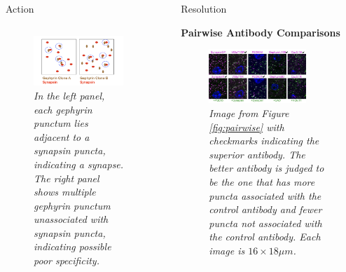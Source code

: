 \documentclass[final, table]{beamer}
\newlength{\sepwid}
\newlength{\onecolwid}
\newlength{\twocolwid}
\begin{document}
\begin{frame}[t]
\begin{columns}[t]
\begin{column}{\twocolwid}
\begin{block}{Action}
\begin{columns}[t]
\begin{column}{\onecolwid}
\begin{figure}
\centering
\includegraphics[width=1\textwidth]{figs/ab_precision_cartoon}
\caption{\textit{In the left panel, each gephyrin punctum lies adjacent to a synapsin puncta, indicating a synapse.  The right panel shows multiple gephyrin punctum unassociated with synapsin puncta, indicating possible poor specificity. } }
\end{figure}


\end{column}
\end{columns} 
\end{block}
\end{column} 

\begin{column}{\sepwid}\end{column}  %
\begin{column}{\onecolwid}

\begin{block}{Resolution} 

\textbf{Pairwise Antibody Comparisons} 


\begin{figure}
\centering
\includegraphics[width=0.8\textwidth]{figs/pairwise_check}
\caption{\textit{Image from Figure \ref{fig:pairwise} with checkmarks indicating the superior antibody. The better antibody is judged to be the one that has more puncta associated with the control antibody and fewer puncta not associated with the control antibody. Each image is $16 \times 18\mu m$. }}
\label{fig:pairwise_check}
\end{figure}



\end{block}
\end{column}
\end{columns}
\end{frame}
\end{document}
